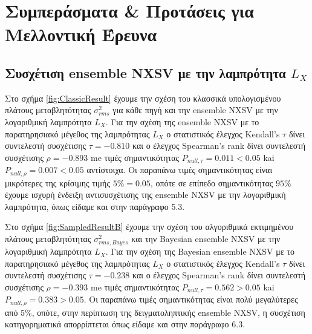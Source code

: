 \chapter{Συμπεράσματα \& Προτάσεις για Μελλοντική Έρευνα} \label{conclusions}

\section{Συσχέτιση \textlatin{ensemble NXSV} με την λαμπρότητα $L_X$}

Στο σχήμα \ref{fig:ClassicResult} έχουμε την σχέση του κλασσικά υπολογισμένου πλάτους μεταβλητότητας $\sigma_{rms}^2$ για κάθε πηγή και την \textlatin{ensemble NXSV} με την λογαριθμική λαμπρότητα $L_X$. Για την σχέση της \textlatin{ensemble NXSV} με το παρατηρησιακό μέγεθος της λαμπρότητας $L_X$ ο στατιστικός έλεγχος \textlatin{Kendall's} $\tau$ δίνει συντελεστή συσχέτισης $\tau = -0.810$ και ο έλεγχος \textlatin{Spearman's rank} δίνει συντελεστή συσχέτισης $\rho= -0.893$ me τιμές σημαντικότητας $P_{null, \tau} =0.011<0.05$ kai $P_{null, \rho} = 0.007<0.05$ αντίστοιχα. Οι παραπάνω τιμές σημαντικότητας είναι μικρότερες της κρίσιμης τιμής $5\%= 0.05$, οπότε σε επίπεδο σημαντικότητας $95\%$ έχουμε ισχυρή ένδειξη αντισυσχέτισης της \textlatin{ensemble NXSV} με την λογαριθμική λαμπρότητα, όπως είδαμε και στην παράγραφο 5.3. 

Στο σχήμα \ref{fig:SampledResultB} έχουμε την σχέση του αλγοριθμικά εκτιμημένου πλάτους μεταβλητότητας $\sigma_{rms, Bayes}^2$ και την \textlatin{Bayesian ensemble NXSV} με την λογαριθμική λαμπρότητα $L_X$. Για την σχέση της \textlatin{Bayesian ensemble NXSV} με το παρατηρησιακό μέγεθος της λαμπρότητας $L_X$ ο στατιστικός έλεγχος \textlatin{Kendall's} $\tau$ δίνει συντελεστή συσχέτισης $\tau = -0.238$ και ο έλεγχος \textlatin{Spearman's rank} δίνει συντελεστή συσχέτισης $\rho= -0.393$ me τιμές σημαντικότητας $P_{null, \tau} =0.562>0.05$ kai $P_{null, \rho} =0.383>0.05$. Οι παραπάνω τιμές σημαντικότητας είναι πολύ μεγαλύτερες από $5\%$, οπότε, στην περίπτωση της δειγματοληπτικής \textlatin{ensemble NXSV}, η συσχέτιση κατηγορηματικά απορρίπτεται όπως είδαμε και στην παράγραφο 6.3.  

